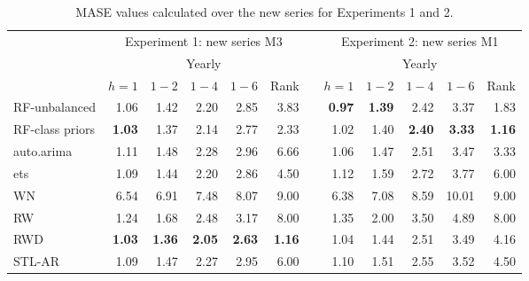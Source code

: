 \documentclass[11pt,a4paper,]{article}
\theoremstyle{definition}
\theoremstyle{definition}
\theoremstyle{definition}
\theoremstyle{remark}
\begin{document}
\begin{table}[!htbp]
\centering\footnotesize
\centering
\caption{MASE values calculated over the new series for Experiments 1 and 2.}
\label{masetab}
\begin{tabular}{lrrrrrrrrrrr}
\toprule
                     &                              \multicolumn{ 5}{c}{Experiment 1: new series M3} &            &                              \multicolumn{ 5}{c}{Experiment 2: new series M1} \\\cmidrule(lr){2-6} \cmidrule(lr){8-12}
                     &                                    \multicolumn{ 5}{c}{Yearly} &            &                                    \multicolumn{ 5}{c}{Yearly} \\
                     &   $h=1$    &    $1-2$   &     $1-4$  &     $1-6$  &      Rank  &            &     $h=1$  &    $1-2$   &     $1-4$  &     $1-6$  &   Rank \\\cmidrule(lr){2-6} \cmidrule(lr){8-12}
RF-unbalanced        &       1.06 &       1.42 &       2.20 &       2.85 &       3.83 &            & {\bf 0.97} & {\bf 1.39} &       2.42 &       3.37 &        1.83 \\
RF-class priors      & {\bf 1.03} &       1.37 &       2.14 &       2.77 &       2.33 &            &       1.02 &       1.40 & {\bf 2.40} & {\bf 3.33} & {\bf 1.16} \\
auto.arima           &       1.11 &       1.48 &       2.28 &       2.96 &       6.66 &            &       1.06 &       1.47 &       2.51 &       3.47 &       3.33 \\
ets                  &       1.09 &       1.44 &       2.20 &       2.86 &       4.50 &            &       1.12 &       1.59 &       2.72 &       3.77 &       6.00 \\
WN                   &       6.54 &       6.91 &       7.48 &       8.07 &       9.00 &            &       6.38 &       7.08 &       8.59 &      10.01 &       9.00 \\
RW                   &       1.24 &       1.68 &       2.48 &       3.17 &       8.00 &            &       1.35 &       2.00 &       3.50 &       4.89 &       8.00 \\
RWD                  & {\bf 1.03} & {\bf 1.36} & {\bf 2.05} & {\bf 2.63} & {\bf 1.16} &            &       1.04 &       1.44 &       2.51 &       3.49 &       4.16 \\
STL-AR               &       1.09 &       1.47 &       2.27 &       2.95 &       6.00 &            &       1.10 &       1.51 &       2.55 &       3.52 &       4.50 \\

\end{tabular}
\end{table}
\end{document}
